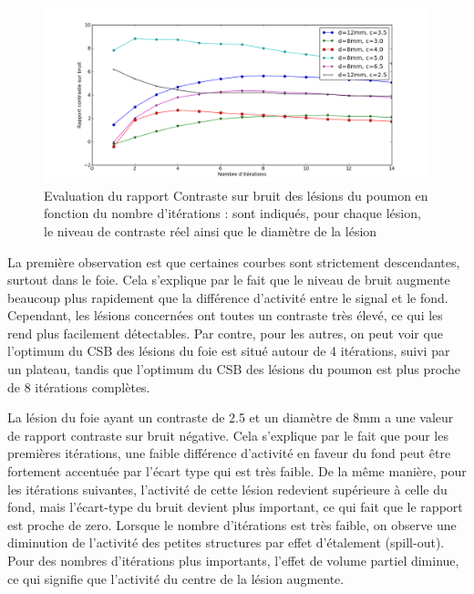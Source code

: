 \begin{figure}
\centering
\includegraphics[width=17cm]{images/CNRPoumon}
\caption[Evaluation du rapport "contraste sur bruit" des lésions du poumon en fonction du nombre d'itérations]{Evaluation du rapport Contraste sur bruit des lésions du poumon en fonction du nombre d'itérations : sont indiqués, pour chaque lésion, le niveau de contraste réel ainsi que le diamètre de la lésion}
\label{fig:CNRPoumon}
\end{figure}

La première observation est que certaines courbes sont strictement descendantes, surtout dans le foie. Cela s'explique par le fait que le niveau de bruit augmente beaucoup plus rapidement que la différence d'activité entre le signal et le fond. Cependant, les lésions concernées ont toutes un contraste très élevé, ce qui les rend plus facilement détectables. Par contre, pour les autres, on peut voir que l'optimum du CSB des lésions du foie est situé autour de 4 itérations, suivi par un plateau, tandis que l'optimum du CSB des lésions du poumon est plus proche de 8 itérations complètes.

La lésion du foie ayant un contraste de 2.5 et un diamètre de 8mm a une valeur de rapport contraste sur bruit négative. Cela s'explique par le fait que pour les premières itérations, une faible différence d'activité en faveur du fond peut être fortement accentuée par l'écart type qui est très faible. De la même manière, pour les itérations suivantes, l'activité de cette lésion redevient supérieure à celle du fond, mais l'écart-type du bruit devient plus important, ce qui fait que le rapport est proche de zero. Lorsque le nombre d'itérations est très faible, on observe une diminution de l'activité des petites structures par effet d'étalement (spill-out). Pour des nombres d'itérations plus importants, l'effet de volume partiel diminue, ce qui signifie que l'activité du centre de la lésion augmente.

